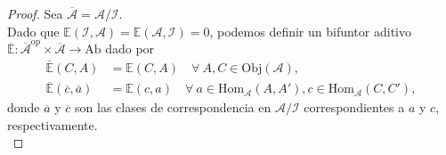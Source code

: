 \documentclass[tesis]{subfiles}
\begin{document}
\begin{proof}

    Sea $\overline{\mathscr{A}} = \mathscr{A}/\mathscr{I}$. \\

    Dado que $\mathbb{E}(\mathscr{I},\mathscr{A}) = \mathbb{E}(\mathscr{A},\mathscr{I}) = 0$, podemos definir un bifuntor aditivo $\overline{\mathbb{E}}: \overline{\mathscr{A}}^\text{op}\times \overline{\mathscr{A}}\to \text{Ab}$ dado por
    \begin{align*}
        \overline{\mathbb{E}}(C,A) &= \mathbb{E}(C,A) \quad \forall \ A,C\in\text{Obj}(\mathscr{A}), \\
        \overline{\mathbb{E}}(\overline{c},\overline{a}) &= \mathbb{E}(c,a) \quad \forall \ a\in\text{Hom}_\mathscr{A}(A,A'), c\in\text{Hom}_\mathscr{A}(C,C'),
    \end{align*}
    donde $\overline{a}$ y $\overline{c}$ son las clases de correspondencia en $\mathscr{A}/\mathscr{I}$ correspondientes a $a$ y $c$, respectivamente. \\


\end{proof}
\end{document}
